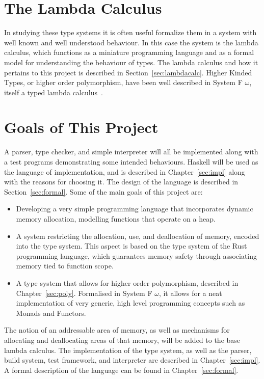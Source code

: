 \section{The Lambda Calculus}
In studying these type systems it is often useful formalize them in a system
with well known and well understood behaviour. In this case the system is the
lambda calculus, which functions as a miniature programming language and as a
formal model for understanding the behaviour of types. The lambda calculus and
how it pertains to this project is described in Section~\ref{sec:lambdacalc}.
Higher Kinded Types, or higher order polymorphism, have been well described in
System F $\omega$, itself a typed lambda calculus~\cite{tapl}.

\section{Goals of This Project}
A parser, type checker, and simple interpreter will all be implemented along
with a test programs demonstrating some intended behaviours. Haskell will be
used as the language of implementation, and is described in
Chapter~\ref{sec:impl} along with the reasons for choosing it.  The design of
the language is described in Section~\ref{sec:formal}.  Some of the main goals
of this project are:

\begin{itemize}
    \item
        Developing a very simple programming language that incorporates dynamic
        memory allocation, modelling functions that operate on a heap. 
    \item
        A system restricting the allocation, use, and deallocation of memory,
        encoded into the type system. This aspect is based on the type system
        of the Rust programming language, which guarantees memory safety
        through associating memory tied to function scope.
    \item 
        A type system that allows for higher order polymorphism, described in
        Chapter~\ref{sec:poly}.  Formalised in System F $\omega$, it allows
        for a neat implementation of very generic, high level programming
        concepts such as Monads and Functors.
\end{itemize}

The notion of an addressable area of memory, as well as mechanisms for
allocating and deallocating areas of that memory, will be added to the base
lambda calculus.  The implementation of the type system, as well as the parser,
build system, test framework, and interpreter are described in
Chapter~\ref{sec:impl}. A formal description of the language can be found in
Chapter~\ref{sec:formal}.

